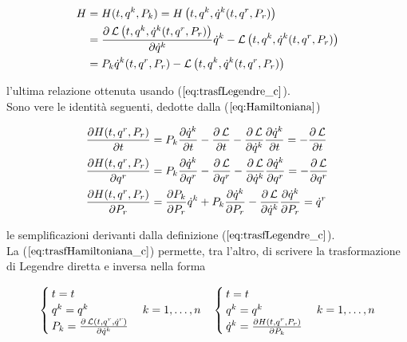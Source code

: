 \begin{equation} \label{eq:Hamiltoniana}
  \begin{split}
    H &= H(t, q^k, P_k) = H\left(t, q^k, \dot{q}^k(t, q^r, P_r)\right)
    \\
    &= \frac{\partial \operatorname{\mathcal{L}} \left(t, q^k, \dot{q}^k(t, q^r, P_r)\right)}{\partial \dot{q}^k} \dot{q}^k - \operatorname{\mathcal{L}} \left(t, q^k, \dot{q}^k(t, q^r, P_r)\right)
    \\
    &= P_k \dot{q}^k(t, q^r, P_r) - \operatorname{\mathcal{L}} \left(t, q^k, \dot{q}^k(t, q^r, P_r)\right)
  \end{split}
\end{equation}

l'ultima relazione ottenuta usando ($ \ref{eq:trasfLegendre_c} $).\\
Sono vere le identità seguenti, dedotte dalla ($ \ref{eq:Hamiltoniana} $)

\begin{subequations} \label{eq:trasfHamiltoniana}    %
  \begin{align}
    \frac{\partial H (t, q^r, P_r)}{\partial t} &= P_k \frac{\partial \dot{q}^k}{\partial t} - \frac{\partial \operatorname{\mathcal{L}}}{\partial t} - \frac{\partial \operatorname{\mathcal{L}}}{\partial \dot{q}^k} \frac{\partial \dot{q}^k}{\partial t} = - \frac{\partial \operatorname{\mathcal{L}}}{\partial t} \label{eq:trasfHamiltoniana_a}\\
    \frac{\partial H (t, q^r, P_r)}{\partial q^r} &= P_k \frac{\partial \dot{q}^k}{\partial q^r} - \frac{\partial \operatorname{\mathcal{L}}}{\partial q^r} - \frac{\partial \operatorname{\mathcal{L}}}{\partial \dot{q}^k} \frac{\partial \dot{q}^k}{\partial q^r} = - \frac{\partial \operatorname{\mathcal{L}}}{\partial q^r} \label{eq:trasfHamiltoniana_b}\\
    \frac{\partial H (t, q^r, P_r)}{\partial P_r} &= \frac{\partial P_k}{\partial P_r} \dot{q}^k + P_k \frac{\partial \dot{q}^k}{\partial P_r} - \frac{\partial \operatorname{\mathcal{L}}}{\partial \dot{q}^k} \frac{\partial \dot{q}^k}{\partial P_r} = \dot{q}^r \label{eq:trasfHamiltoniana_c}
  \end{align}
\end{subequations}

le semplificazioni derivanti dalla definizione ($ \ref{eq:trasfLegendre_c} $). \\
La ($ \ref{eq:trasfHamiltoniana_c} $) permette, tra l'altro, di scrivere la trasformazione di Legendre diretta e inversa nella forma

\begin{equation} \label{eq:trasfLegendre_inv_compl}
  \begin{cases}
    t = t \\
    q^k = q^k \\
    P_k = \frac{\partial \operatorname{\mathcal{L}} (t, q^r, \dot{q}^r)}{\partial \dot{q}^k}
  \end{cases}
  k = 1, \dots, n \quad
  \begin{cases}
    t = t \\
    q^k = q^k\\
    \dot{q}^k = \frac{\partial H(t, q^r, P_r)}{\partial P_k}
  \end{cases}
  k = 1, \dots, n
\end{equation}

